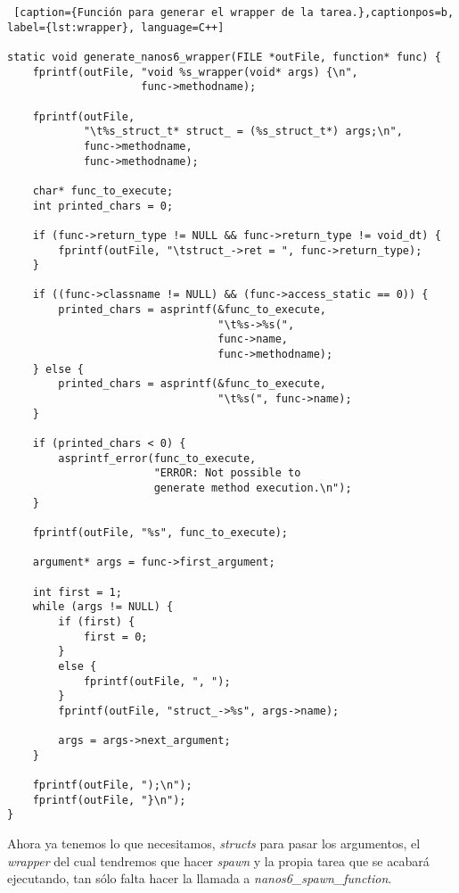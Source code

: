 \begin{lstlisting} [caption={Función para generar el wrapper de la tarea.},captionpos=b, label={lst:wrapper}, language=C++]

static void generate_nanos6_wrapper(FILE *outFile, function* func) {
    fprintf(outFile, "void %s_wrapper(void* args) {\n", 
                     func->methodname);

    fprintf(outFile, 
            "\t%s_struct_t* struct_ = (%s_struct_t*) args;\n", 
            func->methodname, 
            func->methodname);

    char* func_to_execute;
    int printed_chars = 0;

    if (func->return_type != NULL && func->return_type != void_dt) {
        fprintf(outFile, "\tstruct_->ret = ", func->return_type);
    }

    if ((func->classname != NULL) && (func->access_static == 0)) {
        printed_chars = asprintf(&func_to_execute, 
                                 "\t%s->%s(", 
                                 func->name, 
                                 func->methodname);
    } else {
        printed_chars = asprintf(&func_to_execute, 
        						 "\t%s(", func->name);
    }

    if (printed_chars < 0) {
        asprintf_error(func_to_execute, 
                       "ERROR: Not possible to 
                       generate method execution.\n");
    }

    fprintf(outFile, "%s", func_to_execute);

    argument* args = func->first_argument;

    int first = 1;
    while (args != NULL) {
        if (first) {
            first = 0;
        }
        else {
            fprintf(outFile, ", ");
        }
        fprintf(outFile, "struct_->%s", args->name);

        args = args->next_argument;
    }
    
    fprintf(outFile, ");\n");
    fprintf(outFile, "}\n");
}  
\end{lstlisting}
\smallskip

Ahora ya tenemos lo que necesitamos, \textit{structs} para pasar los argumentos, el \textit{wrapper} del cual tendremos que hacer \textit{spawn} y la propia tarea que se acabará ejecutando, tan sólo falta hacer la llamada a \textit{nanos6\_spawn\_function}. 


